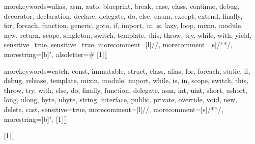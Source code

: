 
\usepackage{xcolor}
\usepackage{xparse}
\usepackage{textcomp}
\usepackage{float}

\usepackage{environ}

\usepackage[nottdefault]{sourcecodepro}

\usepackage{verbatim}
\usepackage{listings}
\usepackage{scalefnt}
\usepackage{needspace}

\usepackage[section]{placeins}


{
	morekeywords={alias, asm, auto, blueprint, break, case, class, continue, debug, decorator, declaration, declare, delegate, do, else, enum, except, extend, finally, for, foreach, function, generic, goto, if, import, in, is, lazy, loop, mixin, module, new, return, scope, singleton, switch, template, this, throw, try, while, with, yield},
	sensitive=true,
	sensitive=true,
	morecomment=[l]{//},
	morecomment=[s]{/*}{*/},
	morestring=[b]",
	alsoletter={\#}
}
[1][]{
	\lstset{language=beast}
}{%
} 
\newcommand{\inlineCode}[1]{\lstinline[%
	language=beast,
	keepspaces,
	breakatwhitespace=true,
	breaklines=true,
	]{#1}}

{
	morekeywords={catch, const, immutable, struct, class, alias, for, foreach, static, if, debug, release, template, mixin, module, import, while, is, in, scope, switch, this, throw, try, with, else, do, finally, function, delegate, asm, int, uint, short, ushort, long, ulong, byte, ubyte, string, interface, public, private, override, void, new, delete, cast},
	sensitive=true,
	morecomment=[l]{//},
	morecomment=[s]{/*}{*/},
	morestring=[b]",
}
[1][]{
	\lstset{language=d}
}{%
} 
\newcommand{\inlineDCode}[1]{\lstinline[%
	language=d,
	keepspaces,
	breakatwhitespace=true,
	breaklines=true
	]{#1}}

[1][]{
	\lstset{language=c++}
}{%
}
\newcommand{\inlineCppCode}[1]{\lstinline[%
	language=c++,
	keepspaces,
	breakatwhitespace=true,
	breaklines=true
	]{#1}}


\newcommand{\ctimeNoXSpace}{\inlineCode{@ctime}}
\newcommand{\ctime}{\ctimeNoXSpace\xspace}
\newcommand{\nonctime}{non-\inlineCode{@ctime}\xspace}

